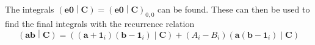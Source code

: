 \documentclass[12pt]{article}
\begin{document}
The integrals $\left(\mathbf{e0}\middle|\mathbf{C}\right) = \left(\mathbf{e0}\middle|\mathbf{C}\right)_{0,0}$ can be found. These can then be used to find the final integrals with the recurrence relation
$$\left(\mathbf{ab}\middle|\mathbf{C}\right) = \left(\left(\mathbf{a} + \mathbf{1}_i\right)\left(\mathbf{b} - \mathbf{1}_i\right)\middle|\mathbf{C}\right) + \left(A_i - B_i\right)\left(\mathbf{a}\left(\mathbf{b} - \mathbf{1}_i\right)\middle|\mathbf{C}\right)$$
\end{document}
